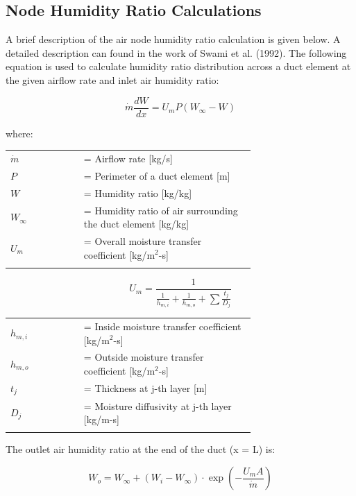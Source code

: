 \subsection{Node Humidity Ratio Calculations}\label{node-humidity-ratio-calculations}

A brief description of the air node humidity ratio calculation is given below. A detailed description can found in the work of Swami et al. (1992). The following equation is used to calculate humidity ratio distribution across a duct element at the given airflow rate and inlet air humidity ratio:

\begin{equation}
\dot{m} \frac{dW}{dx} = U_m P(W_\infty - W)
\end{equation}

where:

\begin{tabular}{lp{0.7\linewidth}}
\\
$\dot{m}$ &= Airflow rate [kg/s]\\
$P$ &= Perimeter of a duct element [m]\\
$W$ &= Humidity ratio [kg/kg]\\
$W_\infty$ &= Humidity ratio of air surrounding the duct element [kg/kg]\\
$U_m$ &= Overall moisture transfer coefficient [kg/m\(^{2}\)-s]\\
\\
\end{tabular}

\begin{equation}
U_m = \frac{1}{\frac{1}{h_{m,i}} + \frac{1}{h_{m,o}} + \sum {\frac{t_j}{D_j}} }
\end{equation}

\begin{tabular}{lp{0.7\linewidth}}
\\
$h_{m,i}$ &= Inside moisture transfer coefficient [kg/m\(^{2}\)-s]\\
$h_{m,o}$ &= Outside moisture transfer coefficient [kg/m\(^{2}\)-s]\\
$t_j$ &= Thickness at j-th layer [m]\\
$D_j$ &= Moisture diffusivity at j-th layer [kg/m-s]\\
\\
\end{tabular}

The outlet air humidity ratio at the end of the duct (x = L) is:

\begin{equation}
W_o = W_\infty + (W_i - W_\infty) \cdot \exp \left(- \frac{U_m A}{\dot{m}} \right)
\end{equation}


